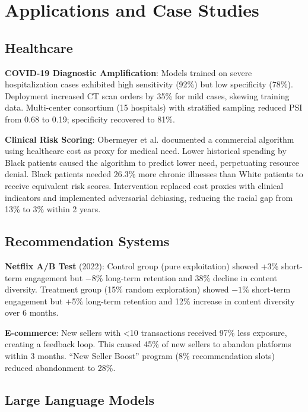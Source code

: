 \documentclass[11pt]{article}
\begin{document}
\section{Applications and Case Studies}

\subsection{Healthcare}

\textbf{COVID-19 Diagnostic Amplification}: Models trained on severe hospitalization cases exhibited high sensitivity (92\%) but low specificity (78\%). Deployment increased CT scan orders by 35\% for mild cases, skewing training data. Multi-center consortium (15 hospitals) with stratified sampling reduced PSI from 0.68 to 0.19; specificity recovered to 81\%\cite{varoquaux2022}.

\textbf{Clinical Risk Scoring}: Obermeyer et al.\cite{obermeyer2019} documented a commercial algorithm using healthcare cost as proxy for medical need. Lower historical spending by Black patients caused the algorithm to predict lower need, perpetuating resource denial. Black patients needed 26.3\% more chronic illnesses than White patients to receive equivalent risk scores. Intervention replaced cost proxies with clinical indicators and implemented adversarial debiasing, reducing the racial gap from 13\% to 3\% within 2 years\cite{vokinger2021}.

\subsection{Recommendation Systems}

\textbf{Netflix A/B Test} (2022): Control group (pure exploitation) showed +3\% short-term engagement but $-8\%$ long-term retention and 38\% decline in content diversity. Treatment group (15\% random exploration) showed $-1\%$ short-term engagement but +5\% long-term retention and 12\% increase in content diversity over 6 months\cite{chen2023}.

\textbf{E-commerce}: New sellers with <10 transactions received 97\% less exposure, creating a feedback loop. This caused 45\% of new sellers to abandon platforms within 3 months. ``New Seller Boost'' program (8\% recommendation slots) reduced abandonment to 28\%.

\subsection{Large Language Models}
\end{document}
